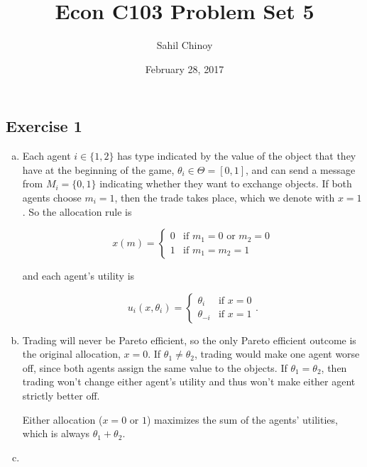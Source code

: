\documentclass{article}
\title{Econ C103 Problem Set 5}
\author{Sahil Chinoy}
\date{February 28, 2017}
\begin{document}
\maketitle{}

\subsection*{Exercise 1}

\begin{enumerate}[(a)]
	\item

	Each agent $i \in \{1,2\}$ has type indicated by the value of the object that they have at the beginning of the game, $\theta_i \in \Theta = [0,1]$, and can send a message from $M_i = \{0,1\}$ indicating whether they want to exchange objects. If both agents choose $m_i = 1$, then the trade takes place, which we denote with $x = 1$. So the allocation rule is

	\begin{equation*}
	x(m) = 
		\begin{cases} 
	      0 & \text{if } m_1 = 0 \text{ or } m_2 = 0 \\
	      1 & \text{if } m_1 = m_2 = 1
	   \end{cases}
	\end{equation*}

	and each agent's utility is

	\begin{equation*}
	u_i(x, \theta_i) = 
		\begin{cases} 
	      \theta_i & \text{if } x = 0 \\
	      \theta_{-i} & \text{if } x  = 1
	   \end{cases}.
	\end{equation*}

	\item

	Trading will never be Pareto efficient, so the only Pareto efficient outcome is the original allocation, $x = 0$. If $\theta_1 \neq \theta_2$, trading would make one agent worse off, since both agents assign the same value to the objects. If $\theta_1 = \theta_2$, then trading won't change either agent's utility and thus won't make either agent strictly better off.

	Either allocation ($x = 0 \text{ or } 1$) maximizes the sum of the agents' utilities, which is always $\theta_1 + \theta_2$.

	\item


\end{enumerate}
\end{document}
